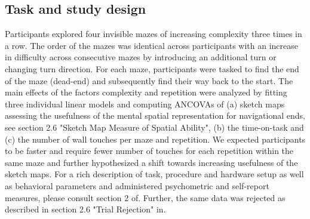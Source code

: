 \subsection{Task and study design}
Participants explored four invisible mazes of increasing complexity three times in a row. The order of the mazes was identical across participants with an increase in difficulty across consecutive mazes by introducing an additional turn or changing turn direction. For each maze, participants were tasked to find the end of the maze (dead-end) and subsequently find their way back to the start. The main effects of the factors complexity and repetition were analyzed by fitting three individual linear models and computing ANCOVAs of (a) sketch maps assessing the usefulness of the mental spatial representation for navigational ends, see section 2.6 "Sketch Map Measure of Spatial Ability"\citep{Gehrke2018}, (b) the time-on-task and (c) the number of wall touches per maze and repetition.
We expected participants to be faster and require fewer number of touches for each repetition within the same maze and further hypothesized a shift towards increasing usefulness of the sketch maps. For a rich description of task, procedure and hardware setup as well as behavioral parameters and administered psychometric and self-report measures, please consult section 2 of\citep{Gehrke2018}. Further, the same data was rejected as described in section 2.6 "Trial Rejection" in\citep{Gehrke2018}.
